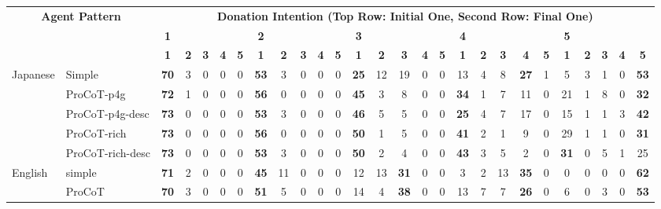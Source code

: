 \setlength{\tabcolsep}{3pt} %

\begin{table}[ht]
    \footnotesize
    \centering
    \begin{tabular}{p{1.3cm}l|ccccc|ccccc|ccccc|ccccc|ccccc}
        \toprule
        \multicolumn{2}{c|}{\multirow{3}{*}{\bf{Agent Pattern}}} & \multicolumn{25}{c}{\bf{Donation Intention (Top Row: Initial One, Second Row: Final One)}} \\
        & & \bf{1} & & & & & \bf{2} & & & & & \bf{3} & & & & & \bf{4} & & & & & \bf{5} & & & & \\
        & & \bf{1} & \bf{2} & \bf{3} & \bf{4} & \bf{5} & \bf{1} & \bf{2} & \bf{3} & \bf{4} & \bf{5} & \bf{1} & \bf{2} & \bf{3} & \bf{4} & \bf{5} & \bf{1} & \bf{2} & \bf{3} & \bf{4} & \bf{5} & \bf{1} & \bf{2} & \bf{3} & \bf{4} & \bf{5} \\
        \midrule
        \multirow{5}{0.5cm}{Japanese} & Simple & \bf{70} & 3 & 0 & 0 & 0 & \bf{53} & 3 & 0 & 0 & 0 & \bf{25} & 12 & 19 & 0 & 0 & 13 & 4 & 8 & \bf{27} & 1 & 5 & 3 & 1 & 0 & \bf{53} \\
        & ProCoT-p4g & \bf{72} & 1 & 0 & 0 & 0 & \bf{56} & 0 & 0 & 0 & 0 & \bf{45} & 3 & 8 & 0 & 0 & \bf{34} & 1 & 7 & 11 & 0 & 21 & 1 & 8 & 0 & \bf{32} \\
        & ProCoT-p4g-desc & \bf{73} & 0 & 0 & 0 & 0 & \bf{53} & 3 & 0 & 0 & 0 & \bf{46} & 5 & 5 & 0 & 0 & \bf{25} & 4 & 7 & 17 & 0 & 15 & 1 & 1 & 3 & \bf{42} \\
        & ProCoT-rich & \bf{73} & 0 & 0 & 0 & 0 & \bf{56} & 0 & 0 & 0 & 0 & \bf{50} & 1 & 5 & 0 & 0 & \bf{41} & 2 & 1 & 9 & 0 & 29 & 1 & 1 & 0 & \bf{31} \\
        & ProCoT-rich-desc & \bf{73} & 0 & 0 & 0 & 0 & \bf{53} & 3 & 0 & 0 & 0 & \bf{50} & 2 & 4 & 0 & 0 & \bf{43} & 3 & 5 & 2 & 0 & \bf{31} & 0 & 5 & 1 & 25 \\
        \midrule
        \multirow{5}{0.5cm}{English} & simple & \bf{71} & 2 & 0 & 0 & 0 & \bf{45} & 11 & 0 & 0 & 0 & 12 & 13 & \bf{31} & 0 & 0 & 3 & 2 & 13 & \bf{35} & 0 & 0 & 0 & 0 & 0 & \bf{62} \\
        & ProCoT & \bf{70} & 3 & 0 & 0 & 0 & \bf{51} & 5 & 0 & 0 & 0 & 14 & 4 & \bf{38} & 0 & 0 & 13 & 7 & 7 & \bf{26} & 0 & 6 & 0 & 3 & 0 & \bf{53} \\

\end{tabular}
\end{table}
